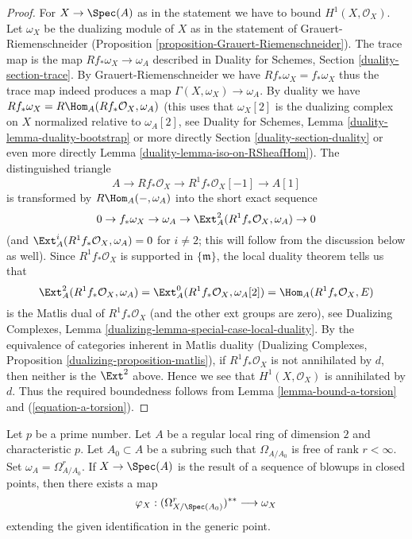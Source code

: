 \begin{proof}
For $X \to \Spec(A)$ as in the statement we have to bound
$H^1(X, \mathcal{O}_X)$. Let $\omega_X$ be the dualizing module
of $X$ as in the statement of Grauert-Riemenschneider
(Proposition \ref{proposition-Grauert-Riemenschneider}).
The trace map is the map $Rf_*\omega_X \to \omega_A$ described
in Duality for Schemes, Section \ref{duality-section-trace}.
By Grauert-Riemenschneider we have $Rf_*\omega_X = f_*\omega_X$
thus the trace map indeed produces a map $\Gamma(X, \omega_X) \to \omega_A$.
By duality we have $Rf_*\omega_X = R\Hom_A(Rf_*\mathcal{O}_X, \omega_A)$
(this uses that $\omega_X[2]$ is the dualizing complex on $X$
normalized relative to $\omega_A[2]$,
see Duality for Schemes, Lemma \ref{duality-lemma-duality-bootstrap}
or more directly Section \ref{duality-section-duality} or even more directly
Lemma \ref{duality-lemma-iso-on-RSheafHom}).
The distinguished triangle
$$
A \to Rf_*\mathcal{O}_X \to R^1f_*\mathcal{O}_X[-1] \to A[1]
$$
is transformed by $R\Hom_A(-, \omega_A)$ into the short exact sequence
$$
0 \to f_*\omega_X \to \omega_A \to
\Ext_A^2(R^1f_*\mathcal{O}_X, \omega_A) \to 0
$$
(and $\Ext_A^i(R^1f_*\mathcal{O}_X, \omega_A) = 0$ for $i \not = 2$;
this will follow from the discussion below as well).
Since $R^1f_*\mathcal{O}_X$ is supported in $\{\mathfrak m\}$, the
local duality theorem tells us that
$$
\Ext_A^2(R^1f_*\mathcal{O}_X, \omega_A) =
\Ext_A^0(R^1f_*\mathcal{O}_X, \omega_A[2]) =
\Hom_A(R^1f_*\mathcal{O}_X, E)
$$
is the Matlis dual of $R^1f_*\mathcal{O}_X$ (and the other
ext groups are zero), see
Dualizing Complexes, Lemma \ref{dualizing-lemma-special-case-local-duality}.
By the equivalence of categories inherent in Matlis duality
(Dualizing Complexes, Proposition \ref{dualizing-proposition-matlis}),
if $R^1f_*\mathcal{O}_X$ is not annihilated by $d$,
then neither is the $\Ext^2$ above. Hence we see that
$H^1(X, \mathcal{O}_X)$ is annihilated by $d$. Thus the required
boundedness follows from Lemma \ref{lemma-bound-a-torsion} and
(\ref{equation-a-torsion}).
\end{proof}

\begin{lemma}
\label{lemma-compare-differentials-dualizing}
Let $p$ be a prime number.
Let $A$ be a regular local ring of dimension $2$ and characteristic $p$.
Let $A_0 \subset A$ be a subring such that $\Omega_{A/A_0}$ is free
of rank $r < \infty$. Set $\omega_A = \Omega^r_{A/A_0}$. If $X \to \Spec(A)$
is the result of a sequence of blowups in closed points, then
there exists a map
$$
\varphi_X : (\Omega^r_{X/\Spec(A_0)})^{**} \longrightarrow \omega_X
$$
extending the given identification in the generic point.
\end{lemma}

